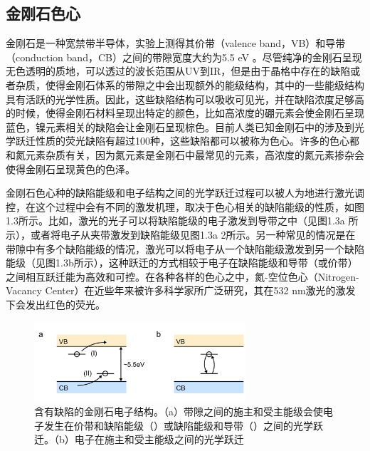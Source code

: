 \documentclass[type = bachelor]{whu-thesis}
\begin{document}
\subsection{金刚石色心}
金刚石是一种宽禁带半导体，实验上测得其价带（valence band，VB）和导带（conduction band，CB）之间的带隙宽度大约为5.5 \unit{\eV} \cite{mildren2013optical,cheng2023bandgap,wort2008diamond}。尽管纯净的金刚石呈现无色透明的质地，可以透过的波长范围从UV到IR，但是由于晶格中存在的缺陷或者杂质，使得金刚石体系的带隙之中会出现额外的能级结构，其中的一些能级结构具有活跃的光学性质。因此，这些缺陷结构可以吸收可见光，并在缺陷浓度足够高的时候，使得金刚石材料呈现出特定的颜色，比如高浓度的硼元素会使金刚石呈现蓝色，镍元素相关的缺陷会让金刚石呈现棕色。目前人类已知金刚石中的涉及到光学跃迁性质的荧光缺陷有超过100种，这些缺陷都可以被称为色心\cite{koizumi2008physics,jelezko2006single}。许多的色心都和氮元素杂质有关，因为氮元素是金刚石中最常见的元素，高浓度的氮元素掺杂会使得金刚石呈现黄色的色泽\cite{breeding2020naturally, zaitsev2016spectroscopic}。

金刚石色心种的缺陷能级和电子结构之间的光学跃迁过程可以被人为地进行激光调控，在这个过程中会有不同的激发机理，取决于色心相关的缺陷能级的性质，如图1.3所示。比如，激光的光子可以将缺陷能级的电子激发到导带之中（见图1.3a \uppercase\expandafter{}所示），或者将电子从夹带激发到缺陷能级见图1.3a \uppercase\expandafter{\romannumeral2所示}。另一种常见的情况是在带隙中有多个缺陷能级的情况，激光可以将电子从一个缺陷能级激发到另一个缺陷能级（见图1.3b所示），这种跃迁的方式相较于电子在缺陷能级和导带（或价带）之间相互跃迁能为高效和可控\cite{gali2011time,gali2012excitation}。在各种各样的色心之中，氮-空位色心（Nitrogen-Vacancy Center）在近些年来被许多科学家所广泛研究，其在532 nm激光的激发下会发出红色的荧光\cite{doherty2013nitrogen}。

\begin{figure}
  \centering
  \includegraphics[width=0.7\textwidth]{figures/Chapter 1/Optical Transition.png}
  \caption{含有缺陷的金刚石电子结构。（a）带隙之间的施主和受主能级会使电子发生在价带和缺陷能级（\uppercase\expandafter{}）或缺陷能级和导带（\uppercase\expandafter{}）之间的光学跃迁。（b）电子在施主和受主能级之间的光学跃迁}
  \label{fig:Optical Transition}
\end{figure}
\end{document}
